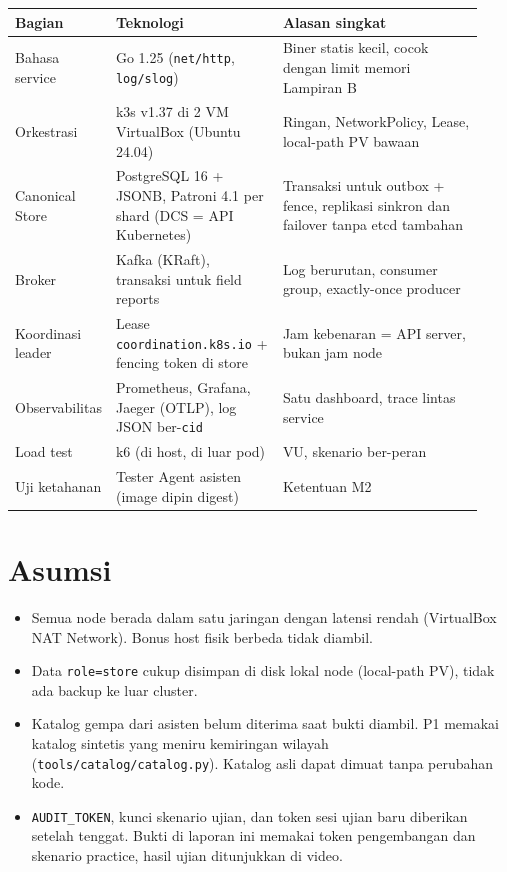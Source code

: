 {\small
\begin{longtable}{@{}>{\raggedright\arraybackslash}p{0.119\linewidth}>{\raggedright\arraybackslash}p{0.365\linewidth}>{\raggedright\arraybackslash}p{0.450\linewidth}@{}}
\toprule
\textbf{Bagian} & \textbf{Teknologi} & \textbf{Alasan singkat} \\
\midrule
\endhead
Bahasa service & Go 1.25 (\texttt{net/\allowbreak{}http}, \texttt{log/\allowbreak{}slog}) & Biner statis kecil, cocok dengan limit memori Lampiran B \\
Orkestrasi & k3s v1.37 di 2 VM VirtualBox (Ubuntu 24.04) & Ringan, NetworkPolicy, Lease, local-path PV bawaan \\
Canonical Store & PostgreSQL 16 + JSONB, Patroni 4.1 per shard (DCS = API Kubernetes) & Transaksi untuk outbox + fence, replikasi sinkron dan failover tanpa etcd tambahan \\
Broker & Kafka (KRaft), transaksi untuk field reports & Log berurutan, consumer group, exactly-once producer \\
Koordinasi leader & Lease \texttt{coordination.\allowbreak{}k8s.\allowbreak{}io} + fencing token di store & Jam kebenaran = API server, bukan jam node \\
Observabilitas & Prometheus, Grafana, Jaeger (OTLP), log JSON ber-\texttt{cid} & Satu dashboard, trace lintas service \\
Load test & k6 (di host, di luar pod) & 10.000 VU, skenario ber-peran \\
Uji ketahanan & Tester Agent asisten (image dipin digest) & Ketentuan M2 \\
\bottomrule
\end{longtable}
}

\section{Asumsi}

\begin{itemize}
\item Semua node berada dalam satu jaringan dengan latensi rendah (VirtualBox NAT Network). Bonus host fisik berbeda tidak diambil.
\item Data \texttt{role=\allowbreak{}store} cukup disimpan di disk lokal node (local-path PV), tidak ada backup ke luar cluster.
\item Katalog gempa dari asisten belum diterima saat bukti diambil. P1 memakai katalog sintetis yang meniru kemiringan wilayah (\texttt{tools/\allowbreak{}catalog/\allowbreak{}catalog.\allowbreak{}py}). Katalog asli dapat dimuat tanpa perubahan kode.
\item \texttt{AUDIT\_\allowbreak{}TOKEN}, kunci skenario ujian, dan token sesi ujian baru diberikan setelah tenggat. Bukti di laporan ini memakai token pengembangan dan skenario practice, hasil ujian ditunjukkan di video.
\end{itemize}

